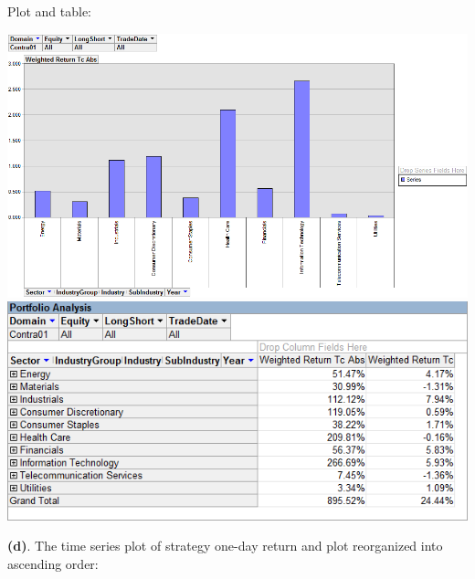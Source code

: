\documentclass[11pt,letter]{article}
\begin{document}
Plot and table:
\begin{center}
\includegraphics[scale=0.5,keepaspectratio]{2c}
\includegraphics[scale=0.5,keepaspectratio]{2c_2}
\end{center}

\textbf{(d)}. The time series plot of strategy one-day return and plot reorganized into ascending order:
\end{document}
